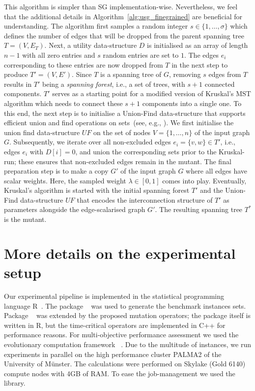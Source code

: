 \documentclass[twoside]{article}
\begin{document}
This algorithm is simpler than SG implementation-wise. Nevertheless, we feel that the additional details in Algorithm~\ref{alg:usg_finegrained} are beneficial for understanding. The algorithm first samples a random integer $s \in \{1, \dots, \sigma\}$ which defines the number of edges that will be dropped from the parent spanning tree $T = (V, E_T)$. Next, a utility data-structure $D$ is initialised as an array of length $n-1$ with all zero entries and $s$ random entries are set to $1$. The edges $e_i$ corresponding to these entries are now dropped from $T$ in the next step to produce $T' = (V, E')$. Since $T$ is a spanning tree of $G$, removing $s$ edges from $T$ results in $T'$ being a \emph{spanning forest}, i.e., a set of trees, with $s+1$ connected components. $T'$ serves as a starting point for a modified version of Kruskal's MST algorithm which needs to connect these $s+1$ components into a single one. To this end, the next step is to initialise a Union-Find data-structure that supports efficient union and find operations on sets~(see, e.g., \cite{cormen2009IntroductionToAlgorithms}). We first initialise the union find data-structure $UF$ on the set of nodes $V=\{1, \ldots, n\}$ of the input graph $G$. Subsequently, we iterate over all non-excluded edges $e_i = \{v,w\} \in T'$, i.e., edges $e_i$ with $D[i]=0$, and union the corresponding sets prior to the Kruskal-run; these ensures that non-excluded edges remain in the mutant. The final preparation step is to make a copy $G'$ of the input graph $G$ where all edges have scalar weights. Here, the sampled weight $\lambda \in [0,1]$ comes into play. Eventually, Kruskal's algorithm is started with the initial spanning forest $T'$ and the Union-Find data-structure $UF$ that encodes the interconnection structure of $T'$ as parameters alongside the edge-scalarised graph $G'$. The resulting spanning tree $T^{*}$ is the mutant.


\section{More details on the experimental setup}
\label{sec:experiments_details}

Our experimental pipeline is implemented in the statistical programming language R~\citep{Rlanguage}. The package ~\citep{B2018grapherator} was used to generate the benchmark instances sets. Package ~\citep{Bo17} was extended by the proposed mutation operators; the package itself is written in R, but the time-critical operators are implemented in C++ for performance reasons. 
For multi-objective performance assessment we used the evolutionary computation framework ~\citep{B2017ecr}. Due to the multitude of instances, we run experiments in parallel on the high performance cluster PALMA2 of the University of M\"unster. The calculations were performed on Skylake 
(Gold 6140) compute nodes with 4GB of RAM. To ease the job-management we used the ~\citep{LBS2017_batchtools} library.
\end{document}
